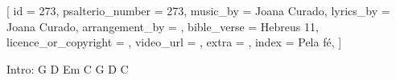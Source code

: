 
[
    id                     = {273},
    psalterio_number       = {273},
    music_by               = {Joana Curado},
    lyrics_by              = {Joana Curado},
    arrangement_by         = {},
    bible_verse            = {Hebreus 11},
    licence_or_copyright   = {},
    video_url              = {},
    extra                  = {},
    index 		   = {Pela fé},
]


\beginverse

Intro: 
G D Em C
G D C

\endverse


\beginverse

